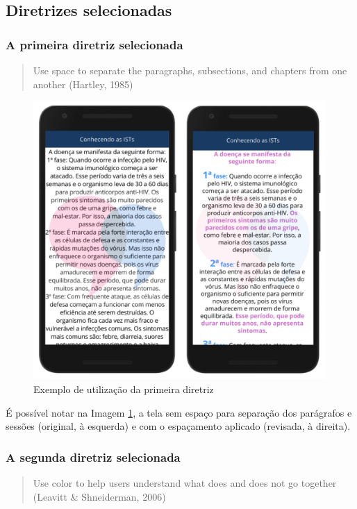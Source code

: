 \documentclass[12pt]{article}
\begin{document}
\subsection{Diretrizes selecionadas}

\subsubsection{A primeira diretriz selecionada}

\begin{quote}
	Use space to separate the paragraphs, subsections, and chapters from one another (Hartley, 1985)
\end{quote}

\begin{figure}[H]
  \centering
  \includegraphics[width=30em]{images/image_1.png}
  \caption{Exemplo de utilização da primeira diretriz}
  \label{fig:img1}
\end{figure}

É possível notar na Imagem \ref{fig:img1}, a tela sem espaço para separação dos parágrafos e sessões (original, à esquerda) e com o espaçamento aplicado (revisada, à direita).

\subsubsection{A segunda diretriz selecionada}

\begin{quote}
	Use color to help users understand what does and does not go together (Leavitt \& Shneiderman, 2006)
\end{quote}
\end{document}
